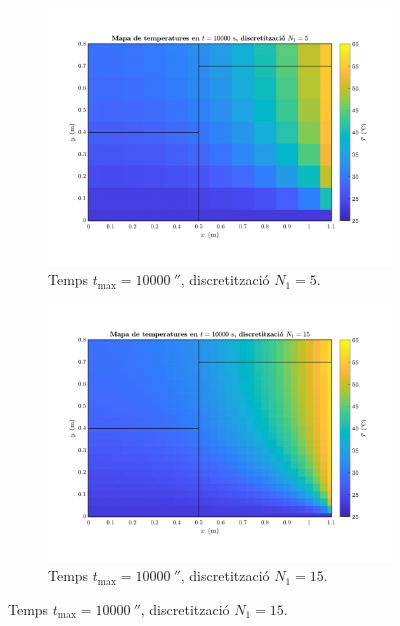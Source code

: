\begin{figure}[ht]
	\centering
	\begin{subfigure}{.5\textwidth}
		\centering
		\includegraphics[width=.95\linewidth]{imagenes/04_analisi_influencia_dades_numeriques/malla/malla_7.pdf}
		\vspace{-15pt}
		\caption{Temps $t_\text{max} = 10000 \ \second$, discretització $N_1 = 5$.}
		\label{fig:malla_7}
	\end{subfigure}%
	\begin{subfigure}{.5\textwidth}
		\centering
		\includegraphics[width=.95\linewidth]{imagenes/04_analisi_influencia_dades_numeriques/malla/malla_8.pdf}
		\vspace{-15pt}
		\caption{Temps $t_\text{max} = 10000 \ \second$, discretització $N_1 = 15$.}
		\label{fig:malla_8}

\end{subfigure}
\end{figure}
